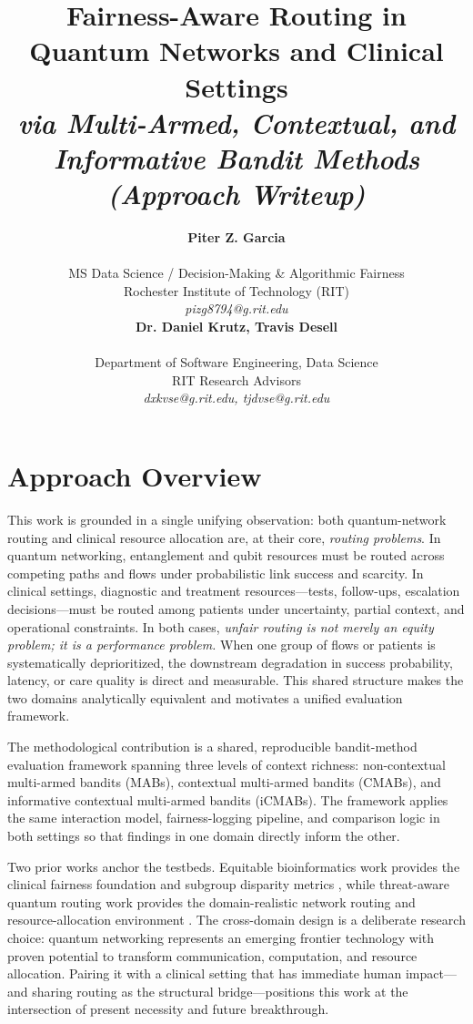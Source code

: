 \documentclass{IEEEtran}
\title{Fairness-Aware Routing in Quantum Networks and Clinical Settings\\[0.3em]
{\large\textit{via Multi-Armed, Contextual, and Informative Bandit Methods}}\\[0.3em]
{\large\textit{(Approach Writeup)}}}
\author{%
\begin{minipage}{0.48\textwidth}
\begin{center}
{\bf Piter Z. Garcia}\\
\begin{small}
MS Data Science / Decision-Making \& Algorithmic Fairness\\
Rochester Institute of Technology (RIT)\\
{\it pizg8794@g.rit.edu}
\end{small}
\end{center}
\end{minipage}
\hfill
\begin{minipage}{0.48\textwidth}
\begin{center}
{\bf Dr. Daniel Krutz, Travis Desell}\\
\begin{small}
Department of Software Engineering, Data Science\\
RIT Research Advisors\\
{\it dxkvse@g.rit.edu, tjdvse@g.rit.edu}
\end{small}
\end{center}
\end{minipage}%
}
\begin{document}
\maketitle

\section{Approach Overview}

This work is grounded in a single unifying observation: both quantum-network
routing and clinical resource allocation are, at their core, \textit{routing
problems}. In quantum networking, entanglement and qubit resources must be
routed across competing paths and flows under probabilistic link success and
scarcity. In clinical settings, diagnostic and treatment resources---tests,
follow-ups, escalation decisions---must be routed among patients under
uncertainty, partial context, and operational constraints. In both cases,
\textit{unfair routing is not merely an equity problem; it is a performance
problem.} When one group of flows or patients is systematically
deprioritized, the downstream degradation in success probability, latency,
or care quality is direct and measurable. This shared structure makes the
two domains analytically equivalent and motivates a unified evaluation
framework.

The methodological contribution is a shared, reproducible bandit-method
evaluation framework spanning three levels of context richness:
non-contextual multi-armed bandits (MABs), contextual multi-armed bandits
(CMABs), and informative contextual multi-armed bandits (iCMABs). The
framework applies the same interaction model, fairness-logging pipeline, and
comparison logic in both settings so that findings in one domain directly
inform the other.

Two prior works anchor the testbeds. Equitable bioinformatics work provides
the clinical fairness foundation and subgroup disparity metrics
\cite{garcia2025equitable_bioinformatics}, while threat-aware quantum
routing work provides the domain-realistic network routing and
resource-allocation environment \cite{garcia2026threat_aware_quantum_routing}.
The cross-domain design is a deliberate research choice: quantum networking
represents an emerging frontier technology with proven potential to transform
communication, computation, and resource allocation. Pairing it with a
clinical setting that has immediate human impact---and sharing routing as the
structural bridge---positions this work at the intersection of present
necessity and future breakthrough.
\end{document}
